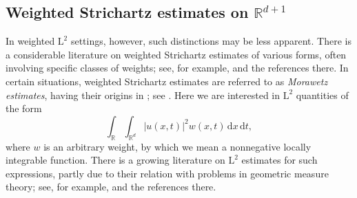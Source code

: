 \documentclass[11pt,reqno]{amsart}
\numberwithin{equation}{section}
\newcommand{\dd}{\,\mathrm{d}}
\begin{document}
\subsection{Weighted Strichartz estimates on \texorpdfstring{$\mathbb{R}^{d+1}$}{Euclidean space}}
In weighted $\mathrm{L}^2$ settings, however, such distinctions may be less apparent. 
There is a considerable literature on weighted Strichartz estimates of various forms, often involving specific classes of weights; see, for example, \cite{BRV} and the references there. In certain situations, weighted Strichartz estimates are referred to as \textit{Morawetz estimates}, having their origins in \cite{Mor}; see \cite{TaoDisp}. 
Here we are interested in $\mathrm{L}^2$ quantities of the form
\begin{equation}\label{weightednorm}
\int_{\mathbb{R}} \int_{\mathbb{R}^d} |u(x,t)|^2w(x,t)\dd x\dd t,
\end{equation}
where $w$ is an arbitrary weight, by which we mean a nonnegative locally integrable function. There is a growing literature on $\mathrm{L}^2$ estimates for such expressions, partly due to their relation with problems in geometric measure theory; see, for example, \cite{Du} and the references there.
\end{document}
